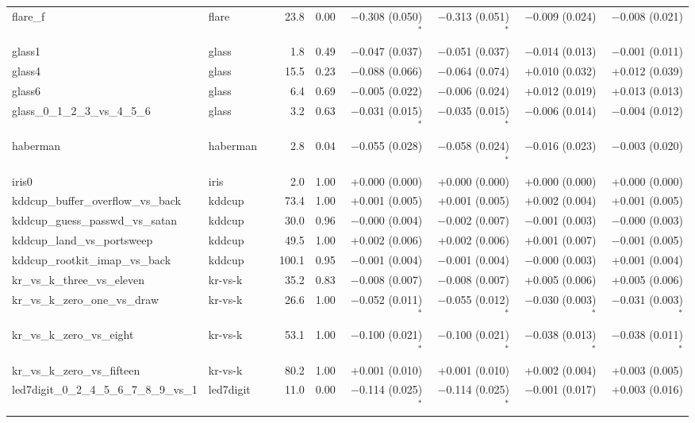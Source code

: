 \begin{table}[!htbp]
\begin{tabular}{lllrrrrrr}
flare\_f & flare &  & 23.8 & 0.00 & $-$0.308 (0.050)$^{*}$ & $-$0.313 (0.051)$^{*}$ & $-$0.009 (0.024) & $-$0.008 (0.021) \\
glass1 & glass &  & 1.8 & 0.49 & $-$0.047 (0.037) & $-$0.051 (0.037) & $-$0.014 (0.013) & $-$0.001 (0.011) \\
glass4 & glass &  & 15.5 & 0.23 & $-$0.088 (0.066) & $-$0.064 (0.074) & +0.010 (0.032) & +0.012 (0.039) \\
glass6 & glass &  & 6.4 & 0.69 & $-$0.005 (0.022) & $-$0.006 (0.024) & +0.012 (0.019) & +0.013 (0.013) \\
glass\_0\_1\_2\_3\_vs\_4\_5\_6 & glass &  & 3.2 & 0.63 & $-$0.031 (0.015)$^{*}$ & $-$0.035 (0.015)$^{*}$ & $-$0.006 (0.014) & $-$0.004 (0.012) \\
haberman & haberman &  & 2.8 & 0.04 & $-$0.055 (0.028) & $-$0.058 (0.024)$^{*}$ & $-$0.016 (0.023) & $-$0.003 (0.020) \\
iris0 & iris &  & 2.0 & 1.00 & +0.000 (0.000) & +0.000 (0.000) & +0.000 (0.000) & +0.000 (0.000) \\
kddcup\_buffer\_overflow\_vs\_back & kddcup &  & 73.4 & 1.00 & +0.001 (0.005) & +0.001 (0.005) & +0.002 (0.004) & +0.001 (0.005) \\
kddcup\_guess\_passwd\_vs\_satan & kddcup &  & 30.0 & 0.96 & $-$0.000 (0.004) & $-$0.002 (0.007) & $-$0.001 (0.003) & $-$0.000 (0.003) \\
kddcup\_land\_vs\_portsweep & kddcup &  & 49.5 & 1.00 & +0.002 (0.006) & +0.002 (0.006) & +0.001 (0.007) & $-$0.001 (0.005) \\
kddcup\_rootkit\_imap\_vs\_back & kddcup &  & 100.1 & 0.95 & $-$0.001 (0.004) & $-$0.001 (0.004) & $-$0.000 (0.003) & +0.001 (0.004) \\
kr\_vs\_k\_three\_vs\_eleven & kr-vs-k &  & 35.2 & 0.83 & $-$0.008 (0.007) & $-$0.008 (0.007) & +0.005 (0.006) & +0.005 (0.006) \\
kr\_vs\_k\_zero\_one\_vs\_draw & kr-vs-k &  & 26.6 & 1.00 & $-$0.052 (0.011)$^{*}$ & $-$0.055 (0.012)$^{*}$ & $-$0.030 (0.003)$^{*}$ & $-$0.031 (0.003)$^{*}$ \\
kr\_vs\_k\_zero\_vs\_eight & kr-vs-k &  & 53.1 & 1.00 & $-$0.100 (0.021)$^{*}$ & $-$0.100 (0.021)$^{*}$ & $-$0.038 (0.013)$^{*}$ & $-$0.038 (0.011)$^{*}$ \\
kr\_vs\_k\_zero\_vs\_fifteen & kr-vs-k &  & 80.2 & 1.00 & +0.001 (0.010) & +0.001 (0.010) & +0.002 (0.004) & +0.003 (0.005) \\
led7digit\_0\_2\_4\_5\_6\_7\_8\_9\_vs\_1 & led7digit &  & 11.0 & 0.00 & $-$0.114 (0.025)$^{*}$ & $-$0.114 (0.025)$^{*}$ & $-$0.001 (0.017) & +0.003 (0.016) \\

\end{tabular}
\end{table}
